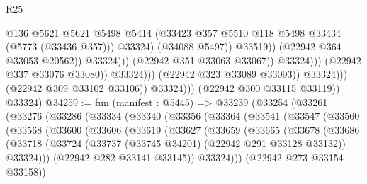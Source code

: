 \begin{lexlean}{R25}
\begin{coremodule}
                                                        @136
                                                        @5621
                                                        @5621
                                                        @5498
                                                        @5414
                                                        (@33423
                                                          @357
                                                          @5510
                                                          @118
                                                          @5498
                                                          @33434
                                                          (@5773 (@33436 @357)))
                                                        @33324)
                                                      (@34088 @5497))
                                                    @33519))
                                                (@22942 @364 @33053 @20562))
                                              @33324)))
                                        (@22942 @351 @33063 @33067))
                                      @33324)))
                                (@22942 @337 @33076 @33080))
                              @33324)))
                        (@22942 @323 @33089 @33093))
                      @33324)))
                (@22942 @309 @33102 @33106))
              @33324)))
        (@22942 @300 @33115 @33119))
      @33324)
@34259 := fun (manifest : @5445) =>
  @33239
    (@33254
      (@33261
        (@33276
          (@33286
            (@33334
              (@33340
                (@33356
                  (@33364
                    (@33541
                      (@33547
                        (@33560
                          (@33568
                            (@33600
                              (@33606
                                (@33619
                                  (@33627
                                    (@33659
                                      (@33665
                                        (@33678
                                          (@33686
                                            (@33718
                                              (@33724
                                                (@33737 (@33745 @34201) (@22942 @291 @33128 @33132))
                                                @33324)))
                                          (@22942 @282 @33141 @33145))
                                        @33324)))
                                  (@22942 @273 @33154 @33158))

\end{coremodule}
\end{lexlean}
